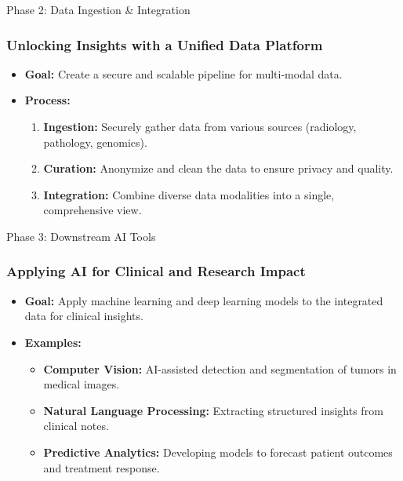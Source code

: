 \documentclass{beamer}
\begin{document}
\begin{frame}{Phase 2: Data Ingestion \& Integration}
    \frametitle{Unlocking Insights with a Unified Data Platform}
    \begin{itemize}
        \item \textbf{Goal:} Create a secure and scalable pipeline for multi-modal data.
        \item \textbf{Process:}
        \begin{enumerate}
            \item \textbf{Ingestion:} Securely gather data from various sources (radiology, pathology, genomics).
            \item \textbf{Curation:} Anonymize and clean the data to ensure privacy and quality.
            \item \textbf{Integration:} Combine diverse data modalities into a single, comprehensive view.
        \end{enumerate}
    \end{itemize}
\end{frame}

\begin{frame}{Phase 3: Downstream AI Tools}
    \frametitle{Applying AI for Clinical and Research Impact}
    \begin{itemize}
        \item \textbf{Goal:} Apply machine learning and deep learning models to the integrated data for clinical insights.
        \item \textbf{Examples:}
        \begin{itemize}
            \item \textbf{Computer Vision:} AI-assisted detection and segmentation of tumors in medical images.
            \item \textbf{Natural Language Processing:} Extracting structured insights from clinical notes.
            \item \textbf{Predictive Analytics:} Developing models to forecast patient outcomes and treatment response.
        \end{itemize}
    \end{itemize}
\end{frame}
\end{document}
